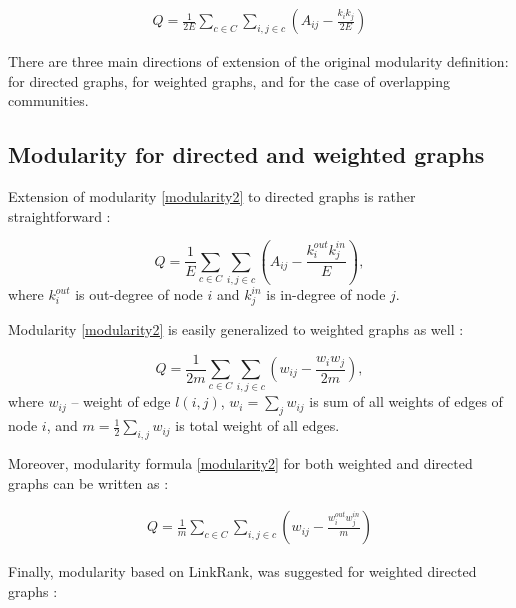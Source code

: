 \documentclass[a4paper,twocolumn]{article}
\begin{document}
\begin{equation}
\label{modularity2}
\begin{aligned}
Q=\frac{1}{2E}\sum_{c\in C}\sum_{i,j\in c}\left ( A_{ij}-\frac{k_ik_j}{2E} \right )
\end{aligned}
\end{equation}

There are three main directions of extension of the original modularity definition: for directed graphs, for weighted graphs, and for the case of overlapping communities.

\subsection{Modularity for directed and weighted graphs}

Extension of modularity \eqref{modularity2} to directed graphs is rather straightforward \cite{Leicht2007}:

\begin{equation}
\label{modularity_dir}
Q=\frac{1}{E}\sum_{c\in C}\sum_{i,j\in c}\left ( A_{ij} - \frac{k_i^{out}k_j^{in}}{E} \right ),
\end{equation}
where $k_i^{out}$ is out-degree of node $i$ and $k_j^{in}$ is in-degree of node $j$.

Modularity \eqref{modularity2} is easily generalized to weighted graphs as well \cite{Newman2004}:

\begin{equation}
\label{modularity_wei}
Q=\frac{1}{2m}\sum_{c\in C}\sum_{i,j\in c}\left ( w_{ij} - \frac{w_iw_j}{2m} \right ),
\end{equation}
where $w_{ij}$ -- weight of edge $l(i,j)$, $w_i = \sum_{j}{w_{ij}}$ is sum of all weights of edges of node $i$, and $m = \frac{1}{2}\sum_{i,j}{w_{ij}}$ is total weight of all edges.

Moreover, modularity formula \eqref{modularity2} for both weighted and directed graphs can be written as \cite{Arenas2007}:

\begin{equation}
\label{modularity_dir_wei}
\begin{aligned}
Q=\frac{1}{m}\sum_{c\in C}\sum_{i,j\in c}\left ( w_{ij}-\frac{w_i^{out}w_j^{in}}{m} \right )
\end{aligned}
\end{equation}

Finally, modularity based on LinkRank, was suggested for weighted directed graphs \cite{Kim2009}:
\end{document}
